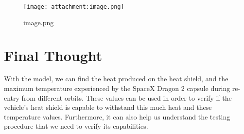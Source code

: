 \documentclass[11pt]{article}
\makeatletter
\def\maxwidth{\ifdim\Gin@nat@width>\linewidth\linewidth
    \else\Gin@nat@width\fi}
\let\Oldincludegraphics\includegraphics
\renewcommand{\includegraphics}[1]{\Oldincludegraphics[width=.8\maxwidth]{#1}}
\makeatother
\begin{document}
    \begin{figure}
\centering
\texttt{[image: attachment:image.png]}
\caption{image.png}
\end{figure}

    \hypertarget{final-thought}{%
\section{Final Thought}\label{final-thought}}

    With the model, we can find the heat produced on the heat shield, and
the maximum temperature experienced by the SpaceX Dragon 2 capsule
during re-entry from different orbits. These values can be used in order
to verify if the vehicle's heat shield is capable to withstand this much
heat and these temperature values. Furthermore, it can also help us
understand the testing procedure that we need to verify its
capabilities.


    
    
    
    
\end{document}
